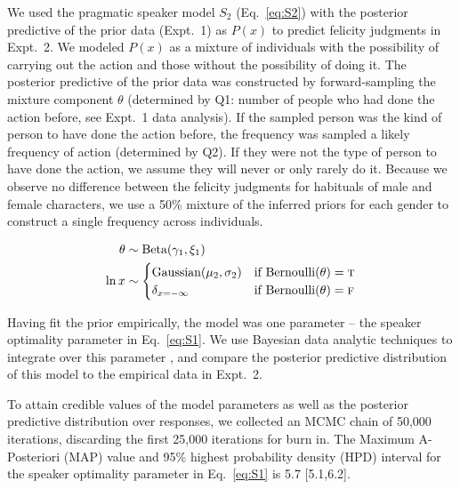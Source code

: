 \documentclass[10pt,letterpaper]{article}
\begin{document}
We used the pragmatic speaker model $S_2$ (Eq.~\ref{eq:S2}) with the posterior predictive of the prior data (Expt.~1) as $P(x)$  to predict felicity judgments in Expt.~2.
We modeled $P(x)$ as a mixture of individuals with the possibility of carrying out the action and those without the possibility of doing it. 
The posterior predictive of the prior data was constructed by forward-sampling the mixture component $\theta$ (determined by Q1: number of people who had done the action before, see Expt.~1 data analysis).
If the sampled person was the kind of person to have done the action before, the frequency was sampled a likely frequency of action (determined by Q2). 
If they were not the type of person to have done the action, we assume they will never or only rarely do it.
Because we observe no difference between the felicity judgments for habituals of male and female characters, we use a 50\% mixture of the inferred priors for each gender to construct a single frequency across individuals.
\begin{minipage}{0.5 \textwidth} \small
\begin{align}
\theta & \sim \text{Beta}(\gamma_{1}, \xi_{1}) \nonumber \\ 
\ln x & \sim \begin{cases}
		\text{Gaussian}(\mu_{2}, \sigma_{2}) &\mbox{if } \text{Bernoulli}(\theta) = \textsc{t} \label{eq:priorModel}  \\
				\delta_{x=-\infty} &\mbox{if } \text{Bernoulli}(\theta) = \textsc{f} \\
		\end{cases}
\end{align}
\end{minipage}

Having fit the prior empirically, the model was one parameter -- the speaker optimality parameter in Eq.~\ref{eq:S1}. 
We use Bayesian data analytic techniques to integrate over this parameter \cite{LW2014}, and compare the posterior predictive distribution of this model to the empirical data in Expt.~2.

To attain credible values of the model parameters as well as the posterior predictive distribution over responses, we collected an MCMC chain of 50,000 iterations, discarding the first 25,000 iterations for burn in.
The Maximum A-Posteriori (MAP) value and 95\% highest probability density (HPD) interval for the speaker optimality parameter in Eq.~\ref{eq:S1} is 5.7 [5.1,6.2].
\end{document}
